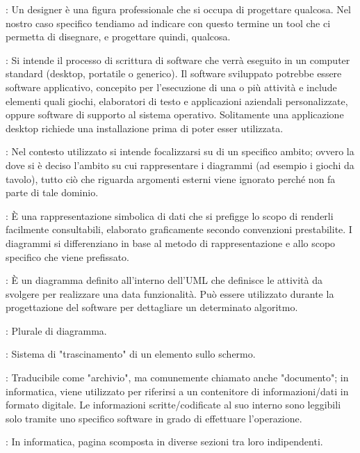 {		: Un designer è una figura professionale che si occupa di progettare qualcosa. Nel nostro caso specifico tendiamo ad indicare con questo termine un tool che ci permetta
di disegnare, e progettare quindi, qualcosa.	

	    : Si intende il processo di scrittura di software che verrà eseguito in un computer standard (desktop, portatile o generico). Il software sviluppato potrebbe essere software applicativo, concepito per l'esecuzione di una o più attività e include elementi quali giochi, elaboratori di testo e applicazioni aziendali personalizzate, oppure software di supporto al sistema operativo. Solitamente una applicazione desktop richiede una installazione prima di poter esser utilizzata.
	     
	    : Nel contesto utilizzato si intende focalizzarsi su di un specifico ambito; ovvero la dove si è deciso l’ambito su cui rappresentare i diagrammi (ad esempio i giochi da tavolo), tutto ciò che riguarda argomenti esterni viene ignorato perché non fa parte di tale dominio.

		: È una rappresentazione simbolica di dati che si prefigge lo scopo di renderli facilmente consultabili, elaborato graficamente secondo convenzioni prestabilite. I diagrammi si differenziano in base al metodo di rappresentazione e allo scopo specifico che viene prefissato.
	
		  : È un diagramma definito all'interno dell’UML che definisce le attività da svolgere per realizzare una data funzionalità. Può essere utilizzato durante la progettazione del software per dettagliare un determinato algoritmo.
		  	
		: Plurale di diagramma.
		
		: Sistema di "trascinamento" di un elemento sullo schermo.
		
	
		: Traducibile come "archivio", ma comunemente chiamato anche "documento"; in informatica, viene utilizzato per riferirsi a un contenitore di informazioni/dati in formato digitale. Le informazioni scritte/codificate al suo interno sono leggibili solo tramite uno specifico software in grado di effettuare l'operazione.
		
		: In informatica, pagina scomposta in diverse sezioni tra loro indipendenti.
		
}
